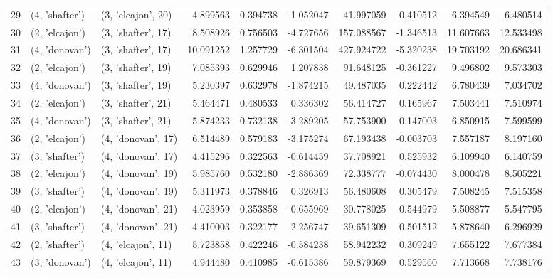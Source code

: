 \begin{tabular}{lllrrrrrrr}
29 &   (4, 'shafter') &  (3, 'elcajon', 20) &   4.899563 &   0.394738 &  -1.052047 &   41.997059 &  0.410512 &   6.394549 &   6.480514 \\
30 &   (2, 'elcajon') &  (3, 'shafter', 17) &   8.508926 &   0.756503 &  -4.727656 &  157.088567 & -1.346513 &  11.607663 &  12.533498 \\
31 &   (4, 'donovan') &  (3, 'shafter', 17) &  10.091252 &   1.257729 &  -6.301504 &  427.924722 & -5.320238 &  19.703192 &  20.686341 \\
32 &   (2, 'elcajon') &  (3, 'shafter', 19) &   7.085393 &   0.629946 &   1.207838 &   91.648125 & -0.361227 &   9.496802 &   9.573303 \\
33 &   (4, 'donovan') &  (3, 'shafter', 19) &   5.230397 &   0.632978 &  -1.874215 &   49.487035 &  0.222442 &   6.780439 &   7.034702 \\
34 &   (2, 'elcajon') &  (3, 'shafter', 21) &   5.464471 &   0.480533 &   0.336302 &   56.414727 &  0.165967 &   7.503441 &   7.510974 \\
35 &   (4, 'donovan') &  (3, 'shafter', 21) &   5.874233 &   0.732138 &  -3.289205 &   57.753900 &  0.147003 &   6.850915 &   7.599599 \\
36 &   (2, 'elcajon') &  (4, 'donovan', 17) &   6.514489 &   0.579183 &  -3.175274 &   67.193438 & -0.003703 &   7.557187 &   8.197160 \\
37 &   (3, 'shafter') &  (4, 'donovan', 17) &   4.415296 &   0.322563 &  -0.614459 &   37.708921 &  0.525932 &   6.109940 &   6.140759 \\
38 &   (2, 'elcajon') &  (4, 'donovan', 19) &   5.985760 &   0.532180 &  -2.886369 &   72.338777 & -0.074430 &   8.000478 &   8.505221 \\
39 &   (3, 'shafter') &  (4, 'donovan', 19) &   5.311973 &   0.378846 &   0.326913 &   56.480608 &  0.305479 &   7.508245 &   7.515358 \\
40 &   (2, 'elcajon') &  (4, 'donovan', 21) &   4.023959 &   0.353858 &  -0.655969 &   30.778025 &  0.544979 &   5.508877 &   5.547795 \\
41 &   (3, 'shafter') &  (4, 'donovan', 21) &   4.410003 &   0.322177 &   2.256747 &   39.651309 &  0.501512 &   5.878640 &   6.296929 \\
42 &   (2, 'shafter') &  (4, 'elcajon', 11) &   5.723858 &   0.422246 &  -0.584238 &   58.942232 &  0.309249 &   7.655122 &   7.677384 \\
43 &   (3, 'donovan') &  (4, 'elcajon', 11) &   4.944480 &   0.410985 &  -0.615386 &   59.879369 &  0.529560 &   7.713668 &   7.738176 \\

\end{tabular}
